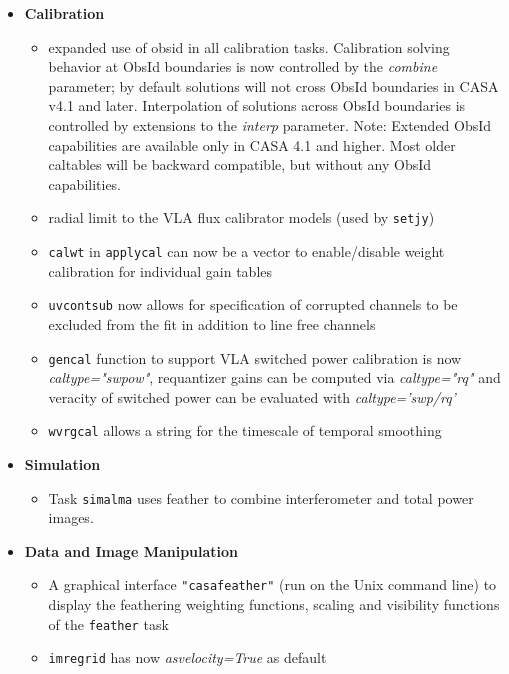 \begin{itemize}
\item  {\bf Calibration}

\begin{itemize}

   \item  expanded use of obsid in all calibration tasks. Calibration
     solving behavior at ObsId boundaries is now controlled by the
     {\it combine} parameter; by default solutions will not cross
     ObsId boundaries in CASA v4.1 and later. Interpolation of
     solutions across ObsId boundaries is controlled by extensions to
     the {\it interp} parameter. Note: Extended ObsId capabilities are available only in CASA 4.1 and higher. Most older caltables will be backward compatible, but without any ObsId capabilities. 
   \item  radial limit to the VLA flux calibrator models (used by {\tt setjy})
   \item  {\tt calwt} in {\tt applycal} can now be a vector to enable/disable weight calibration for individual gain tables
   \item  {\tt uvcontsub} now allows for specification of corrupted channels to be excluded from the fit in addition to line free channels 
   \item  {\tt gencal} function to support VLA switched power
   calibration is now {\it caltype="swpow"}, requantizer gains can
   be computed via {\it caltype="rq"} and veracity of switched power
   can be evaluated with {\it caltype='swp/rq'}
   \item  {\tt wvrgcal} allows a string for the timescale of temporal smoothing

\end{itemize}

\item  {\bf Simulation}
\begin{itemize}
   \item  Task {\tt simalma} uses feather to combine interferometer and total power images.
\end{itemize}


\item  {\bf Data and Image Manipulation} 
\begin{itemize}
    \item  A graphical interface {\tt "casafeather"} (run on the Unix
  command line) to display the feathering weighting functions, scaling
  and visibility functions of the {\tt feather} task

  \item {\tt imregrid} has now {\it asvelocity=True} as default
\end{itemize}


\end{itemize}
